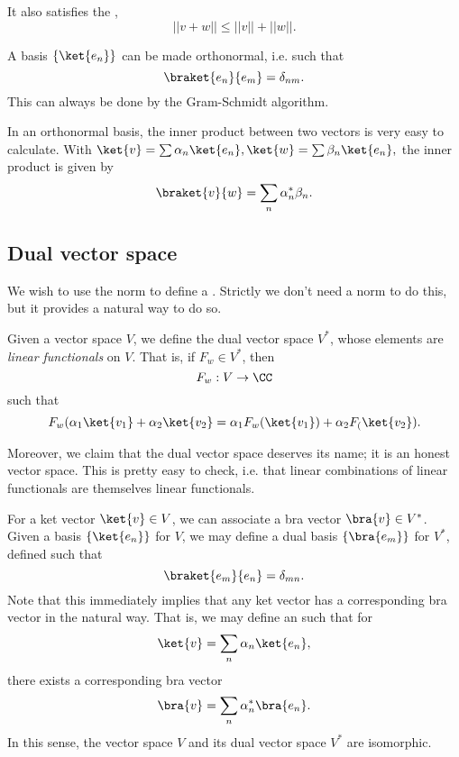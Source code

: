 It also satisfies the ,
\begin{equation}
    ||v+w||\leq ||v|| + ||w||.
\end{equation}

A basis $\set{\ket{e_n}}$ can be made orthonormal, i.e. such that 
\begin{equation}
    \braket{e_n}{e_m} = \delta_{nm}.
\end{equation}
This can always be done by the Gram-Schmidt algorithm.

In an orthonormal basis, the inner product between two vectors is very easy to calculate. With $\ket{v}=\sum \alpha_n \ket{e_n}, \ket{w} =\sum \beta_n \ket{e_n},$ the inner product is given by
\begin{equation}
    \braket{v}{w}=\sum_n \alpha_n^* \beta_n.
\end{equation}

\subsection*{Dual vector space}
We wish to use the norm to define a . Strictly we don't need a norm to do this, but it provides a natural way to do so.
\begin{defn}
    Given a vector space $V$, we define the dual vector space $V^*$, whose elements are \emph{linear functionals} on $V$. That is, if $F_w \in V^*$, then
    \begin{equation}
        F_w:V\to \CC
    \end{equation}
    such that
    \begin{equation}
        F_w(\alpha_1 \ket{v_1} + \alpha_2 \ket{v_2}=\alpha_1 F_w (\ket{v_1}) +\alpha_2 F_ (\ket{v_2}).
    \end{equation}
\end{defn}

Moreover, we claim that the dual vector space deserves its name; it is an honest vector space. This is pretty easy to check, i.e. that linear combinations of linear functionals are themselves linear functionals.

For a ket vector $\ket{v}\in V$, we can associate a bra vector $\bra{v}\in V^*$. Given a basis $\set{\ket{e_n}}$ for $V$, we may define a dual basis $\set{\bra{e_m}}$ for $V^*$, defined such that
\begin{equation}
    \braket{e_m}{e_n}=\delta_{mn}.
\end{equation}
Note that this immediately implies that any ket vector has a corresponding bra vector in the natural way. That is, we may define an  such that for
\begin{equation}
    \ket{v}=\sum_n \alpha_n \ket{e_n},
\end{equation}
there exists a corresponding bra vector
\begin{equation}
    \bra{v}=\sum_n \alpha_n^* \bra{e_n}.
\end{equation}
In this sense, the vector space $V$ and its dual vector space $V^*$ are isomorphic.

